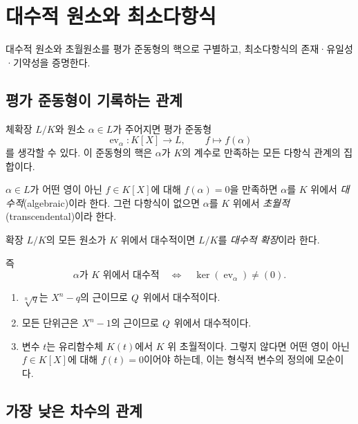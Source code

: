 \section{대수적 원소와 최소다항식}
\label{sec:algebraic-elements}

\begin{learninggoal}
대수적 원소와 초월원소를 평가 준동형의 핵으로 구별하고, 최소다항식의 존재·유일성·기약성을 증명한다.
\end{learninggoal}

\subsection{평가 준동형이 기록하는 관계}

체확장 $L/K$와 원소 $\alpha\in L$가 주어지면 평가 준동형
\[
  \operatorname{ev}_\alpha:K[X]\longrightarrow L,
  \qquad
  f\longmapsto f(\alpha)
\]
를 생각할 수 있다. 이 준동형의 핵은 $\alpha$가 $K$의 계수로 만족하는 모든 다항식 관계의 집합이다.

\begin{definition}
$\alpha\in L$가 어떤 영이 아닌 $f\in K[X]$에 대해 $f(\alpha)=0$을 만족하면 $\alpha$를 $K$ 위에서 \emph{대수적}(algebraic)이라 한다. 그런 다항식이 없으면 $\alpha$를 $K$ 위에서 \emph{초월적}(transcendental)이라 한다.

확장 $L/K$의 모든 원소가 $K$ 위에서 대수적이면 $L/K$를 \emph{대수적 확장}이라 한다.
\end{definition}

즉
\[
  \alpha\text{가 }K\text{ 위에서 대수적}
  \quad\Longleftrightarrow\quad
  \ker(\operatorname{ev}_\alpha)\ne(0).
\]

\begin{example}
\begin{enumerate}[label=(\alph*)]
  \item $\sqrt[n]{q}$는 $X^n-q$의 근이므로 $Q$ 위에서 대수적이다.
  \item 모든 단위근은 $X^n-1$의 근이므로 $Q$ 위에서 대수적이다.
  \item 변수 $t$는 유리함수체 $K(t)$에서 $K$ 위 초월적이다. 그렇지 않다면 어떤 영이 아닌 $f\in K[X]$에 대해 $f(t)=0$이어야 하는데, 이는 형식적 변수의 정의에 모순이다.
\end{enumerate}
\end{example}

\subsection{가장 낮은 차수의 관계}

